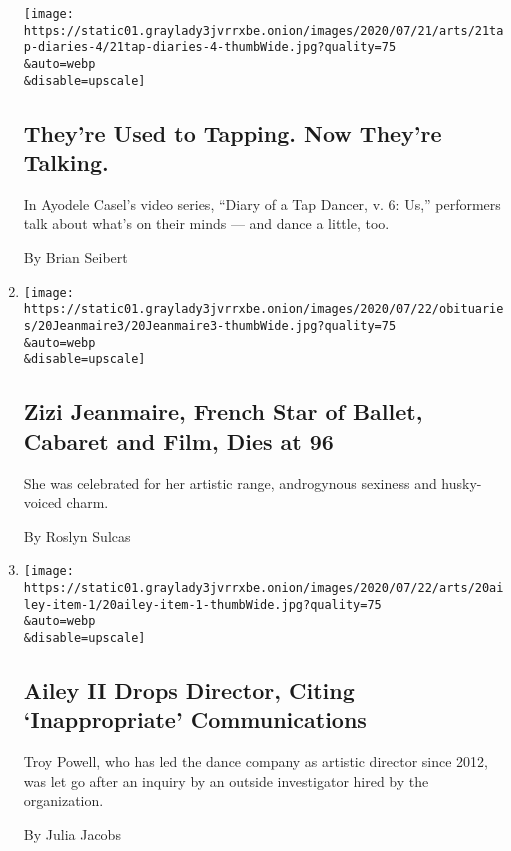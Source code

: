 \begin{enumerate}
  \texttt{[image: https://static01.graylady3jvrrxbe.onion/images/2020/07/21/arts/21tap-diaries-4/21tap-diaries-4-thumbWide.jpg?quality=75\\\&auto=webp\\\&disable=upscale]}

  \hypertarget{theyre-used-to-tapping-now-theyre-talking}{%
  \subsection{They're Used to Tapping. Now They're
  Talking.}\label{theyre-used-to-tapping-now-theyre-talking}}

  In Ayodele Casel's video series, ``Diary of a Tap Dancer, v. 6: Us,''
  performers talk about what's on their minds --- and dance a little,
  too.

  By Brian Seibert
\item
  \href{/2020/07/21/arts/dance/zizi-jeanmaire-french-star-of-ballet-cabaret-and-film-dies-at-96.html}{}

  \texttt{[image: https://static01.graylady3jvrrxbe.onion/images/2020/07/22/obituaries/20Jeanmaire3/20Jeanmaire3-thumbWide.jpg?quality=75\\\&auto=webp\\\&disable=upscale]}

  \hypertarget{zizi-jeanmaire-french-star-of-ballet-cabaret-and-film-dies-at-96}{%
  \subsection{Zizi Jeanmaire, French Star of Ballet, Cabaret and Film,
  Dies at
  96}\label{zizi-jeanmaire-french-star-of-ballet-cabaret-and-film-dies-at-96}}

  She was celebrated for her artistic range, androgynous sexiness and
  husky-voiced charm.

  By Roslyn Sulcas
\item
  \href{/2020/07/20/arts/dance/ailey-ii-troy-powell.html}{}

  \texttt{[image: https://static01.graylady3jvrrxbe.onion/images/2020/07/22/arts/20ailey-item-1/20ailey-item-1-thumbWide.jpg?quality=75\\\&auto=webp\\\&disable=upscale]}

  \hypertarget{ailey-ii-drops-director-citing-inappropriate-communications}{%
  \subsection{Ailey II Drops Director, Citing `Inappropriate'
  Communications}\label{ailey-ii-drops-director-citing-inappropriate-communications}}

  Troy Powell, who has led the dance company as artistic director since
  2012, was let go after an inquiry by an outside investigator hired by
  the organization.

  By Julia Jacobs
\end{enumerate}

